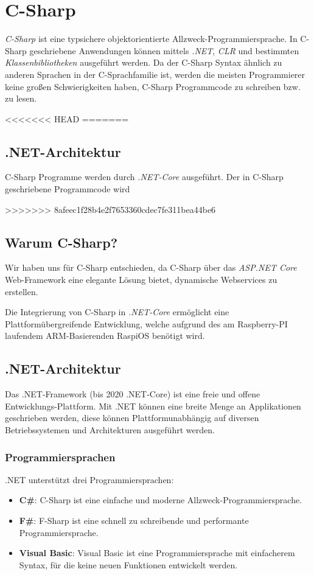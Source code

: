 \section{C-Sharp}
\label{C-Sharp}

\textit{C-Sharp} ist eine typsichere objektorientierte Allzweck-Programmiersprache.
In C-Sharp geschriebene Anwendungen können mittels \textit{.NET}, \textit{CLR} und bestimmten 
\textit{Klassenbibliotheken} ausgeführt werden. 
Da der C-Sharp Syntax ähnlich zu anderen Sprachen in der C-Sprachfamilie ist, werden die meisten
Programmierer keine großen Schwierigkeiten haben, C-Sharp Programmcode zu schreiben bzw. zu lesen.  
\cite{csharpmicrosoft}

<<<<<<< HEAD
=======
\subsection{.NET-Architektur}
C-Sharp Programme werden durch \textit{.NET-Core} ausgeführt. 
Der in C-Sharp geschriebene Programmcode wird 

>>>>>>> 8afeec1f28b4e2f7653360cdec7fe311bea44be6
\subsection{Warum C-Sharp?}
Wir haben uns für C-Sharp entschieden, da C-Sharp über das \textit{ASP.NET Core} Web-Framework eine elegante 
Lösung bietet, dynamische Webservices zu erstellen.

Die Integrierung von C-Sharp in \textit{.NET-Core} ermöglicht eine Plattformübergreifende Entwicklung, 
welche aufgrund des am Raspberry-PI laufendem ARM-Basierenden RaspiOS benötigt wird.

\subsection{.NET-Architektur}
Das .NET-Framework (bis 2020 .NET-Core) ist eine freie und offene Entwicklungs-Plattform. Mit .NET können eine breite Menge an
Applikationen geschrieben werden, diese können Plattformunabhängig auf diversen Betriebssystemen
und Architekturen ausgeführt werden. \cite{dotnetmicrosoft} 

\subsubsection{Programmiersprachen}
.NET unterstützt drei Programmiersprachen:
\begin{itemize}
    \item \textbf{C\#}: C-Sharp ist eine einfache und moderne Allzweck-Programmiersprache.
    \item \textbf{F\#}: F-Sharp ist eine schnell zu schreibende und performante Programmiersprache.
    \item \textbf{Visual Basic}: Visual Basic ist eine Programmiersprache mit einfacherem Syntax, für die keine
    neuen Funktionen entwickelt werden.  
\end{itemize}

